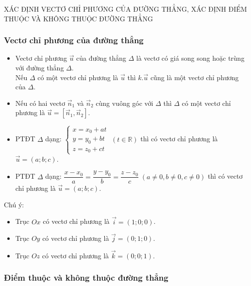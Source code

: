 \begin{dang}{XÁC ĐỊNH VECTƠ CHỈ PHƯƠNG CỦA ĐƯỜNG THẲNG, XÁC ĐỊNH ĐIỂM THUỘC VÀ KHÔNG THUỘC ĐƯỜNG THẲNG}
\end{dang}
 

 \subsubsection{Vectơ chỉ phương của đường thẳng}

\begin{itemize}
	\item  Vectơ chỉ phương $\overrightarrow{u}$ của đường thẳng $\Delta $ là vectơ có giá song song hoặc trùng với đường thẳng $\Delta $.\\
Nếu $\Delta $ có một vectơ chỉ phương là $\overrightarrow{u}$ thì $k.\overrightarrow{u}$ cũng là một vectơ chỉ phương của $\Delta $.
	\item    Nếu có hai vectơ $\overrightarrow{n}_{1} $ và $\overrightarrow{n}_{2} $ cùng vuông góc với $\Delta $ thì $\Delta $ có một vectơ chỉ phương là $\overrightarrow{u}=[\overrightarrow{n}_{1} ,\overrightarrow{n}_{2} ].$
   \item PTĐT \(\Delta\) dạng: \(\left\{\begin{array}{l} x = x_0 + at \\ y = y_0 + bt \\ z = z_0 + ct \end{array}\right. \; (t \in \mathbb{R})\) thì có vectơ chỉ phương là \(\overrightarrow{u} = (a; b; c)\).
    \item PTĐT \(\Delta\) dạng: \(\dfrac{x - x_0}{a} = \dfrac{y - y_0}{b} = \dfrac{z - z_0}{c} \; (a \neq 0, b \neq 0, c \neq 0)\) thì có vectơ chỉ phương là \(\overrightarrow{u} = (a; b; c)\).
\end{itemize}

\begin{note} Chú ý:
\begin{itemize}
	\item  Trục $Ox$ có vectơ chỉ phương là $\overrightarrow{i}=(1;0;0)$.
	\item  Trục $Oy$ có vectơ chỉ phương là $\overrightarrow{j}=(0;1;0)$.
	\item  Trục $Oz$ có vectơ chỉ phương là $\overrightarrow{k}=(0;0;1)$.
\end{itemize}
 \end{note}

\subsubsection{Điểm thuộc và không thuộc đường thẳng}

